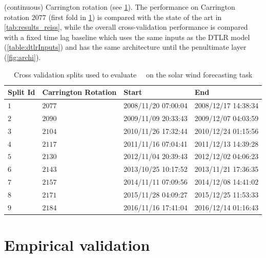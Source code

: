 (continuous) Carrington rotation (see \cref{table:dtlrsplits}). The performance on Carrington 
rotation $2077$ (first fold in \cref{table:dtlrsplits}) is compared with the state of the art 
\citep{Riley2011} in \cref{tab:results_reiss}, while the overall cross-validation performance 
is compared with a fixed time lag baseline which uses the same inputs as the DTLR model 
(\cref{table:dtlrInputs}) and has the same architecture until the penultimate layer 
(\cref{fig:archi}). 
%
\begin{table}[ht]
  \centering
  \caption{Cross validation splits used to evaluate \ \XX \ on the solar wind forecasting task}
  \label{table:dtlrsplits}
  \begin{tabular}{llll}
  \hline
  \textbf{Split Id} & \textbf{Carrington Rotation} & \textbf{Start} & \textbf{End}\\ \hline
  $1$ & $2077$ & 2008/11/20 07:00:04 & 2008/12/17 14:38:34  \\
  $2$ & $2090$ & 2009/11/09 20:33:43 & 2009/12/07 04:03:59  \\
  $3$ & $2104$ & 2010/11/26 17:32:44 & 2010/12/24 01:15:56  \\
  $4$ & $2117$ & 2011/11/16 07:04:41 & 2011/12/13 14:39:28  \\
  $5$ & $2130$ & 2012/11/04 20:39:43 & 2012/12/02 04:06:23  \\
  $6$ & $2143$ & 2013/10/25 10:17:52 & 2013/11/21 17:36:35  \\
  $7$ & $2157$ & 2014/11/11 07:09:56 & 2014/12/08 14:41:02  \\
  $8$ & $2171$ & 2015/11/28 04:09:27 & 2015/12/25 11:53:33  \\
  $9$ & $2184$ & 2016/11/16 17:41:04 & 2016/12/14 01:16:43  \\
  \hline
  \end{tabular}
  \end{table}
%


\section{Empirical validation}\label{sec:proofconcept}

